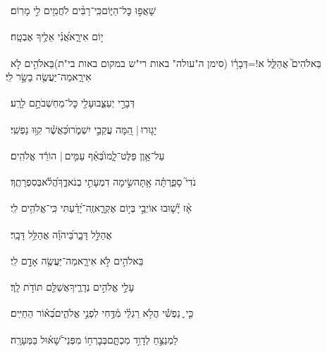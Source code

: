 \documentclass[12pt]{article}
\newcommand{\loc}[1]{\textsuperscript{\locf{#1}}}
\begin{document}
{\loc{ ג}~}‏שָׁאֲפ֣וּ  כׇּל־הַיּ֑וֹם{\hfill}כִּֽי־רַבִּ֨ים לֹחֲמִ֖ים לִ֣י מָרֽוֹם׃\par

{\loc{ ד}~}‏י֥וֹם אִירָ֑א{\hfill}אֲ֝נִ֗י אֵלֶ֥יךָ אֶבְטָֽח׃\par

{\loc{ ה}~}‏בֵּאלֹהִים֮ אֲהַלֵּ֢ל א!=דְּבָר֥֫וֹ (סימן ה"עולה" באות רי"ש במקום באות בי"ת){\hfill}בֵּאלֹהִ֣ים \newline\hspace*{.5em}לֹ֣א אִירָ֑א{\hfill}מַה־יַּעֲשֶׂ֖ה בָשָׂ֣ר לִֽי׃\par

{\loc{ ו}~}‏ דְּבָרַ֣י יְעַצֵּ֑בוּ{\hfill}עָלַ֖י כׇּל־מַחְשְׁבֹתָ֣ם לָרָֽע׃\par

{\loc{ ז}~}‏יָג֤וּרוּ |   הֵ֭מָּה עֲקֵבַ֣י יִשְׁמֹ֑רוּ{\hfill}כַּ֝אֲשֶׁ֗ר קִוּ֥וּ נַפְשִֽׁי׃\par

{\loc{ ח}~}‏עַל־אָ֥וֶן פַּלֶּט־לָ֑מוֹ{\hfill}בְּ֝אַ֗ף עַמִּ֤ים |  הוֹרֵ֬ד אֱלֹהִֽים׃\par

{\loc{ ט}~}‏נֹדִי֮ סָפַ֢רְתָּ֫ה אָ֥תָּה{\hfill}שִׂ֣ימָה דִמְעָתִ֣י בְנֹאדֶ֑ךָ\newline\hspace*{.5em}הֲ֝לֹ֗א{\hfill}בְּסִפְרָתֶֽךָ׃\par

{\loc{ י}~}‏אָ֨ז יָ֘שׁ֤וּבוּ אוֹיְבַ֣י  בְּי֣וֹם אֶקְרָ֑א{\hfill}זֶֽה־יָ֝דַ֗עְתִּי כִּֽי־אֱלֹהִ֥ים לִֽי׃\par

{\loc{ יא}~}‏ אֲהַלֵּ֣ל דָּבָ֑ר{\hfill}בַּ֝יהֹוָ֗ה אֲהַלֵּ֥ל דָּבָֽר׃\par

{\loc{ יב}~}‏בֵּאלֹהִ֣ים  לֹּ֣א אִירָ֑א{\hfill}מַה־יַּעֲשֶׂ֖ה אָדָ֣ם לִֽי׃\par

{\loc{ יג}~}‏עָלַ֣י אֱלֹהִ֣ים נְדָרֶ֑יךָ{\hfill}אֲשַׁלֵּ֖ם תּוֹדֹ֣ת לָֽךְ׃\par

{\loc{ יד}~}‏כִּ֤י ֪ נַפְשִׁ֡י {\hfill}הֲלֹ֥א רַגְלַ֗י מִ֫דֶּ֥חִי\newline\hspace*{.5em} לִפְנֵ֣י אֱלֹהִ֑ים{\hfill}בְּ֝א֗וֹר הַחַיִּֽים׃\par\pend
\ledpb
\pstart[\subsection*{\textcolor{red}{פרק נז}}]\label{פרק נז}
{\loc{ א}~}‏לַמְנַצֵּ֣חַ  לְדָוִ֣ד מִכְתָּ֑ם{\hfill}בְּבׇרְח֥וֹ מִפְּנֵי־שָׁ֝א֗וּל בַּמְּעָרָֽה׃\par
\end{document}
